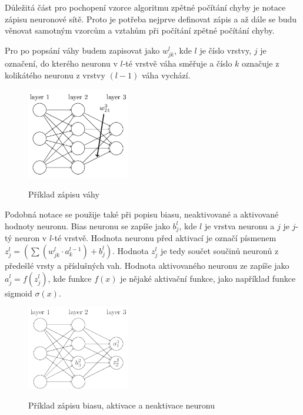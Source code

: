 Důležitá část pro pochopení vzorce algoritmu zpětné počítání chyby je notace zápisu neuronové sítě.
Proto je potřeba nejprve definovat zápis a až dále se budu věnovat samotným vzorcům a vztahům při počítání zpětné počítání chyby.

Pro po popsání váhy budem zapisovat jako \(w_{jk}^l\), kde \(l\) je číslo vrstvy, \(j\) je označení,
do kterého neuronu v \(l\)-té vrstvě váha směřuje a číslo \(k\) označuje z kolikátého neuronu z vrstvy \((l-1)\) váha vychází.

\begin{figure}[h]
    \centering
    \includegraphics[width=0.4\textwidth]{images/vaha_v_siti.png}
    \caption{Příklad zápisu váhy}\cite{vaha_v_siti}
\end{figure}

Podobná notace se použije také při popisu biasu, neaktivované a aktivované hodnoty neuronu.
Bias neuronu se zapíše jako \(b_{j}^l\), kde \(l\) je vrstva neuronu a \(j\) je \(j\)-tý neuron v \(l\)-té vrstvě.
Hodnota neuronu před aktivací je označí písmenem \(z_{j}^{l} = \left( \sum (w^{l}_{jk} \cdot a^{l-1}_k) + b^l_j \right)\).
Hodnota \(z_j^l\) je tedy součet součinů neuronů z předešlé vrsty a příslušných vah.
Hodnota aktivovaného neuronu ze zapíše jako \(a_j^l = f(z_j^l)\), kde funkce \(f(x)\) je nějaké aktivační funkce,
jako například funkce sigmoid \(\sigma(x)\).

\begin{figure}[h]
    \centering
    \includegraphics[width=0.4\textwidth]{images/bias_a_neuron.png}
    \caption{Příklad zápisu biasu, aktivace a neaktivace neuronu} \cite{bias_a_neuron}
\end{figure}

